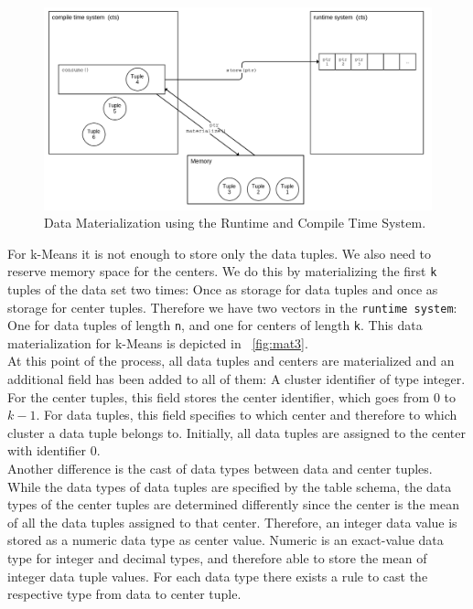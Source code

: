 \begin{figure}[htsb]
  \centerline{
  \includegraphics[scale=0.37]{figures/mat2_font3}
  }
  \caption[Data Materialization using the Runtime and Compile Time System]{Data Materialization using the Runtime and Compile Time System.}
  \label{fig:mat2}
\end{figure}

For k-Means it is not enough to store only the data tuples. We also need to reserve memory space for the centers. We do this by materializing the first \texttt{k} tuples of the data set two times: Once as storage for data tuples and once as storage for center tuples. Therefore we have two vectors in the \texttt{runtime system}: One for data tuples of length \texttt{n}, and one for centers of length \texttt{k}. This data materialization for k-Means is depicted in ~\autoref{fig:mat3}.
\\ 
At this point of the process, all data tuples and centers are materialized and an additional field has been added to all of them: A cluster identifier of type integer. For the center tuples, this field stores the center identifier, which goes from 0 to $k - 1$. For data tuples, this field specifies to which center and therefore to which cluster a data tuple belongs to. Initially, all data tuples are assigned to the center with identifier 0. 
\\
Another difference is the cast of data types between data and center tuples. While the data types of data tuples are specified by the table schema, the data types of the center tuples are determined differently since the center is the mean of all the data tuples assigned to that center. Therefore, an integer data value is stored as a numeric data type as center value. Numeric is an exact-value data type for integer and decimal types, and therefore able to store the mean of integer data tuple values. For each data type there exists a rule to cast the respective type from data to center tuple.



